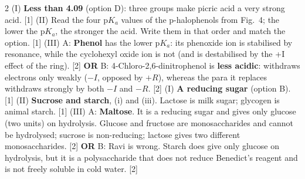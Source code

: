 \documentclass[10pt,a4paper]{extarticle}
\newcommand{\mk}[1]{{\scriptsize\color{black!55}[#1]}}
\begin{document}
\begin{multicols}{2}
\An (I) \textbf{Less than 4.09} (option D): three  groups make picric acid a very strong acid. \mk{1}\nl
(II) \chk Read the four p$K_a$ values of the p-halophenols from Fig.\ 4; the lower the p$K_a$, the stronger the acid. Write them in that order and match the option. \mk{1}\nl
(III) A: \textbf{Phenol} has the lower p$K_a$: its phenoxide ion is stabilised by resonance, while the cyclohexyl oxide ion is not (and is destabilised by the +I effect of the ring). \mk{2}\nl
\textbf{OR} B: 4-Chloro-2,6-dinitrophenol is \textbf{less acidic}:  withdraws electrons only weakly ($-I$, opposed by $+R$), whereas the para  it replaces withdraws strongly by both $-I$ and $-R$. \mk{2}
\An (I) \textbf{A reducing sugar} (option B). \mk{1}\nl
(II) \textbf{Sucrose and starch}, (i) and (iii). Lactose is milk sugar; glycogen is animal starch. \mk{1}\nl
(III) A: \textbf{Maltose}. It is a reducing sugar and gives only glucose (two units) on hydrolysis. Glucose and fructose are monosaccharides and cannot be hydrolysed; sucrose is non-reducing; lactose gives two different monosaccharides. \mk{2}\nl
\textbf{OR} B: Ravi is wrong. Starch does give only glucose on hydrolysis, but it is a polysaccharide that does not reduce Benedict's reagent and is not freely soluble in cold water. \mk{2}


\end{multicols}
\end{document}
